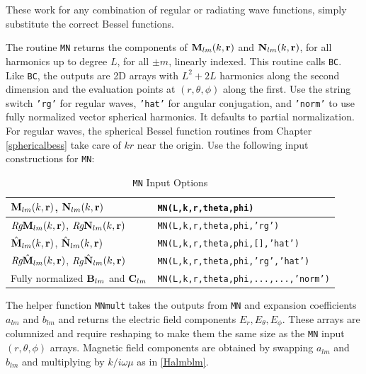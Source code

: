 These work for any combination of regular or radiating wave functions, simply substitute the correct Bessel functions.  

The routine \texttt{MN} returns the components of $\mathbf{M}_{lm}(k,\mathbf{r})$ and $\mathbf{N}_{lm}(k,\mathbf{r})$, for all harmonics up to degree $L$, for all $\pm m$, linearly indexed. This routine calls \texttt{BC}. Like \texttt{BC}, the outputs are 2D arrays with $L^2 + 2L$ harmonics along the second dimension and the evaluation points at $(r,\theta,\phi)$ along the first.  Use the string switch \texttt{'rg'} for regular waves, \texttt{'hat'} for angular conjugation, and \texttt{'norm'} to use fully normalized vector spherical harmonics. It defaults to partial normalization. For regular waves, the spherical Bessel function routines from Chapter \ref{sphericalbess} take care of $kr$ near the origin.  Use the following input constructions for \texttt{MN}:

\renewcommand{\arraystretch}{1.5}
\begin{table}[H]
\caption{\texttt{MN} Input Options}
\begin{center}
\begin{tabular}{|l|l|}
\hline
$\mathbf{M}_{lm}(k,\mathbf{r})$, $\mathbf{N}_{lm}(k,\mathbf{r})$ & \texttt{MN(L,k,r,theta,phi)} \\
\hline
$\textit{Rg}\mathbf{M}_{lm}(k,\mathbf{r})$, $\textit{Rg}\mathbf{N}_{lm}(k,\mathbf{r})$ & \texttt{MN(L,k,r,theta,phi,'rg')} \\
\hline
$\hat{\mathbf{M}}_{lm}(k,\mathbf{r})$, $\hat{\mathbf{N}}_{lm}(k,\mathbf{r})$ & \texttt{MN(L,k,r,theta,phi,[],'hat') } \\
\hline
$\textit{Rg}\hat{\mathbf{M}}_{lm}(k,\mathbf{r})$, \textit{Rg}$\hat{\mathbf{N}}_{lm}(k,\mathbf{r})$ & \texttt{MN(L,k,r,theta,phi,'rg','hat')}  \\ 
\hline
Fully normalized $\mathbf{B}_{lm}$ and $\mathbf{C}_{lm}$& \texttt{MN(L,k,r,theta,phi,...,...,'norm')} \\
\hline 
\end{tabular}
\end{center}
\label{default}
\end{table}

The helper function \texttt{MNmult} takes the outputs from \texttt{MN} and expansion coefficients $a_{lm}$ and $b_{lm}$ and returns the electric field components $E_r, E_{\theta}, E_{\phi}$. These arrays are columnized and require reshaping to make them the same size as the \texttt{MN} input $(r, \theta,\phi)$ arrays. Magnetic field components are obtained by swapping $a_{lm}$ and $b_{lm}$ and multiplying by $k/i\omega\mu$ as in \eqref{Halmblm}. 

{\footnotesize
{}
}

